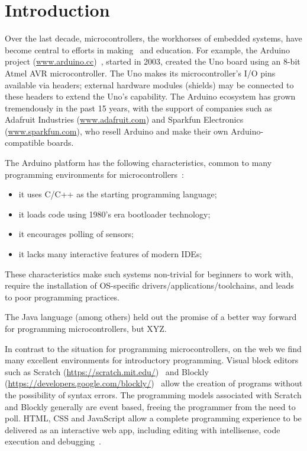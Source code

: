 \section{Introduction}
\label{sec:intro}

Over the last decade, microcontrollers, the workhorses of embedded systems, have become
central to efforts in making~\cite{dougherty2012maker} and education. For example, the Arduino project
(\url{www.arduino.cc})~\cite{buildingArduino2014},
started in 2003, created the Uno board using an 8-bit Atmel
AVR microcontroller. The Uno makes its microcontroller's I/O pins available via headers;
external hardware modules (shields) may be connected to these headers to extend
the Uno's capability. The Arduino ecosystem has grown tremendously in the past 15 years,
with the support of companies such as Adafruit Industries (\url{www.adafruit.com}) and
Sparkfun Electronics (\url{www.sparkfun.com}), who resell Arduino and make their
own Arduino-compatible boards. 

The Arduino platform has the following characteristics, common to many programming
environments for microcontrollers~\cite{XYZ}:
\begin{itemize}
\item it uses C/C++ as the starting programming language;
\item it loads code using 1980's era bootloader technology;
\item it encourages polling of sensors;
\item it lacks many interactive features of modern IDEs;
\end{itemize}
These characteristics make such systems non-trivial for beginners to work with, 
require the installation of OS-specific drivers/applications/toolchains,
and leads to poor programming practices.

The Java language (among others) held out the promise of a better way forward for 
programming microcontrollers, but XYZ.  

In contrast to the situation for programming microcontrollers, 
on the web we find many excellent environments for introductory programming.
Visual block editors such as Scratch (\url{https://scratch.mit.edu/})~\cite{ScratchCACM2009,BlocksBeyondCACM2017}
and Blockly (\url{https://developers.google.com/blockly/})~\cite{Blocky2015}
allow the creation of programs without the possibility of syntax errors.
The programming models associated with Scratch and Blockly generally are
event based, freeing the programmer from the need to poll.
HTML, CSS and JavaScript allow a complete programming experience to be delivered as an interactive
web app, including editing with intellisense, code execution and debugging~\cite{Monaco}. 

